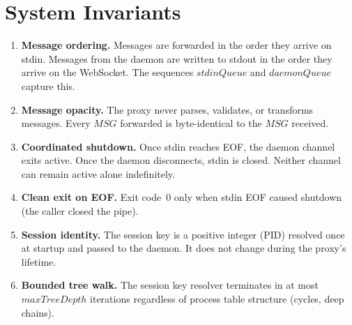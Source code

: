 \documentclass[a4paper,10pt,fleqn]{article}
\begin{document}
\section{System Invariants}

\begin{enumerate}
  \item \textbf{Message ordering.}  Messages are forwarded in the order
    they arrive on stdin.  Messages from the daemon are written to stdout
    in the order they arrive on the WebSocket.  The sequences
    $stdinQueue$ and $daemonQueue$ capture this.

  \item \textbf{Message opacity.}  The proxy never parses, validates, or
    transforms messages.  Every $MSG$ forwarded is byte-identical to the
    $MSG$ received.

  \item \textbf{Coordinated shutdown.}  Once stdin reaches EOF, the daemon
    channel exits active.  Once the daemon disconnects, stdin is closed.
    Neither channel can remain active alone indefinitely.

  \item \textbf{Clean exit on EOF.}  Exit code~0 only when stdin EOF
    caused shutdown (the caller closed the pipe).

  \item \textbf{Session identity.}  The session key is a positive integer
    (PID) resolved once at startup and passed to the daemon.  It does not
    change during the proxy's lifetime.

  \item \textbf{Bounded tree walk.}  The session key resolver terminates
    in at most $maxTreeDepth$ iterations regardless of process table
    structure (cycles, deep chains).
\end{enumerate}
\end{document}
